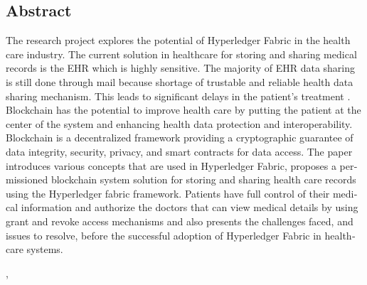 

\begin{otherlanguage}{american}
	\chapter*{Abstract}

	
	The research project explores the potential of Hyperledger Fabric in the health care industry. The current solution in healthcare for storing and sharing medical records is the \ac{EHR} which is highly sensitive. The majority of EHR data sharing is still done through mail because shortage of trustable and reliable health data sharing mechanism. This leads to significant delays in the patient's treatment \cite{EHR}. Blockchain has the potential to improve health care by putting the patient at the center of the system and enhancing health data protection and interoperability. Blockchain is a decentralized framework providing a cryptographic guarantee of data integrity, security, privacy, and smart contracts for data access. The paper introduces various concepts that are used in Hyperledger Fabric, proposes a permissioned blockchain system solution for storing and sharing health care records using the Hyperledger fabric framework. Patients have full control of their medical information and authorize the doctors that can view medical details by using grant and revoke access mechanisms and also presents the challenges faced, and issues to resolve, before the successful adoption of Hyperledger Fabric in healthcare systems.
	
\end{otherlanguage}



\hfill

\vfill

\noindent \textit{\myTitle}, \ifdef{\mySubtitle}{\mySubtitle,}{} %
\\\textcopyright\ \myTime










